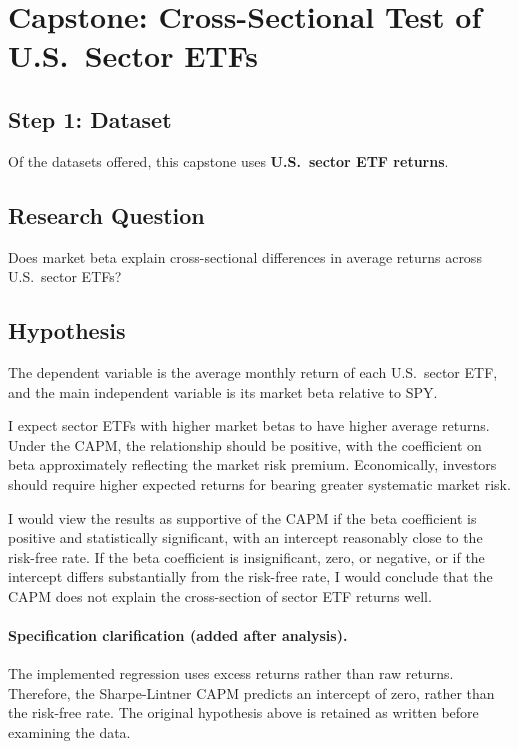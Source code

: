 \section{Capstone: Cross-Sectional Test of U.S.\ Sector ETFs}

\subsection{Step 1: Dataset}

Of the datasets offered, this capstone uses \textbf{U.S.\ sector ETF returns}.

\subsection{Research Question}

Does market beta explain cross-sectional differences in average returns across
U.S.\ sector ETFs?

\subsection{Hypothesis}

The dependent variable is the average monthly return of each U.S.\ sector ETF,
and the main independent variable is its market beta relative to SPY.

I expect sector ETFs with higher market betas to have higher average returns.
Under the CAPM, the relationship should be positive, with the coefficient on
beta approximately reflecting the market risk premium. Economically, investors
should require higher expected returns for bearing greater systematic market
risk.

I would view the results as supportive of the CAPM if the beta coefficient is
positive and statistically significant, with an intercept reasonably close to
the risk-free rate. If the beta coefficient is insignificant, zero, or
negative, or if the intercept differs substantially from the risk-free rate, I
would conclude that the CAPM does not explain the cross-section of sector ETF
returns well.

\paragraph{Specification clarification (added after analysis).} The implemented
regression uses excess returns rather than raw returns. Therefore, the
Sharpe-Lintner CAPM predicts an intercept of zero, rather than the risk-free
rate. The original hypothesis above is retained as written before examining the
data.

